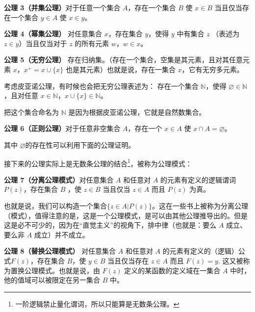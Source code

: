 \textbf{公理 3（并集公理）}对于任意一个集合 $A$，存在一个集合 $B$ 使 $x\in B$ 当且仅当存在一个集合 $y\in A$ 使 $x\in y$。

\textbf{公理 4（幂集公理）} 对任意集合 $x$，存在集合 $y$，使得 $y$ 中有集合 $z$ （表述为 $z \in y$）当且仅当对于 $z$ 的所有元素 $w$，$w\in x$。

\textbf{公理 5（无穷公理）} 存在归纳集。（存在一个集合，空集是其元素，且对其任意元素 $x$，$x^+ = x\cup \{x\}$ 也是其元素）也就是说，存在一集合 $x$，它有无穷多元素。

考虑皮亚诺公理，有时候也会把无穷公理表述为：
存在一个集合 $\mathbb{N}$，使得 $\varnothing\in\mathbb{N}$，且对任意 $x\in \mathbb{N}$，$x\cup\{x\}\in\mathbb{N}$。

把这个集合命名为 $\mathbb{N}$ 是因为根据皮亚诺公理，它就是自然数集合。

\textbf{公理 6（正则公理）}对于任意非空集合 $A$，存在一个 $x\in A$ 使 $x\cap A=\varnothing$。

其中 $\varnothing $的存在性可以利用下面的公理证明。

接下来的公理实际上是无数条公理的结合\footnote{一阶逻辑禁止量化谓词，所以只能算是无数条公理。}，被称为公理模式：

\textbf{公理 7（分离公理模式）}对任意集合 $A$ 和任意对 $A$ 的元素有定义的逻辑谓词 $P(z)$，存在集合 $B$ ，使 $z\in B$ 当且仅当 $z\in A$ 而且 $P(z)$ 为真。

也就是说，我们可以构造一个集合$\{z\in A | P(z)\}$。这在一些书上被称为分离公理（模式），值得注意的是，这是一个公理模式，是可以由其他公理推导出的。但是这是必不可少的，因为在“直觉主义”的视角下，排中律（也就是：要么 $A$ 成立、要么非 $A$ 成立）并不成立。

\textbf{公理 8（替换公理模式）} 对任意集合 $A$ 和任意对 $A$ 的元素有定义的（逻辑）公式$F(z)$，存在集合 $B$，使 $y\in B$ 当且仅当存在 $z\in A$ 而且 $F(z)=y$. 这又被称为置换公理模式。也就是说，由 $F(z)$ 定义的某函数的定义域在一集合 $A$ 中时，他的值域可以被限定在另一集合 $B$ 中。


